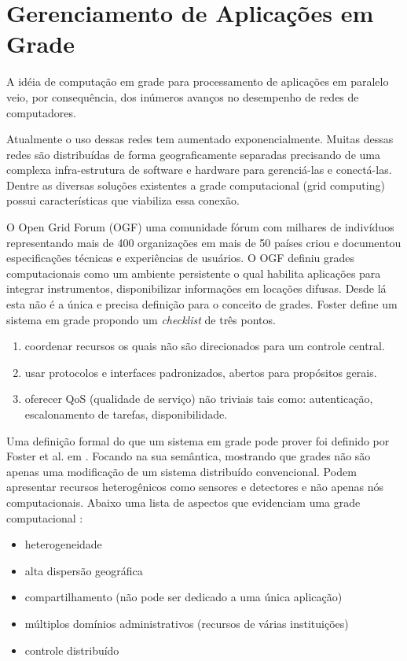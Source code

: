 \chapter{Gerenciamento de Aplicações em Grade}
\label{cap:gerenciamento}

A idéia de computação em grade para processamento de aplicações em paralelo veio, por consequência, dos inúmeros avanços no desempenho de redes de computadores.

Atualmente o uso dessas redes tem aumentado exponencialmente. Muitas dessas redes são distribuídas de forma geograficamente separadas precisando de uma complexa infra-estrutura de software e hardware para gerenciá-las e conectá-las. Dentre as diversas soluções existentes a grade computacional (grid computing) possui características que viabiliza essa conexão.

O Open Grid Forum (OGF) uma comunidade fórum com milhares de indivíduos representando mais de 400 organizações em mais de 50 países criou e documentou \cite{M.2002} especificações técnicas e experiências de usuários. O OGF definiu grades computacionais como um ambiente persistente o qual habilita aplicações para integrar instrumentos, disponibilizar informações em locações difusas. Desde lá esta não é a única e precisa definição para o conceito de grades. Foster \cite{Kesselman2001} define um sistema em grade propondo um \emph{checklist} de três pontos.

\begin{enumerate}
	\item coordenar recursos os quais não são direcionados para um controle central.
	\item usar protocolos e interfaces padronizados, abertos para propósitos gerais.
	\item oferecer QoS (qualidade de serviço) não triviais tais como: autenticação, escalonamento de tarefas, disponibilidade.
\end{enumerate}

Uma definição formal do que um sistema em grade pode prover foi definido por Foster et al. em \cite{Foster2002}. Focando na sua semântica, mostrando que grades não são apenas uma modificação de um sistema distribuído convencional. Podem apresentar recursos heterogênicos como sensores e detectores e não apenas nós computacionais. Abaixo uma lista de aspectos que evidenciam uma grade computacional \cite{Cirne2002}:

\begin{itemize}
	\item heterogeneidade
	\item alta dispersão geográfica
	\item compartilhamento (não pode ser dedicado a uma única aplicação)
	\item múltiplos domínios administrativos (recursos de várias instituições)
	\item controle distribuído 
\end{itemize}

